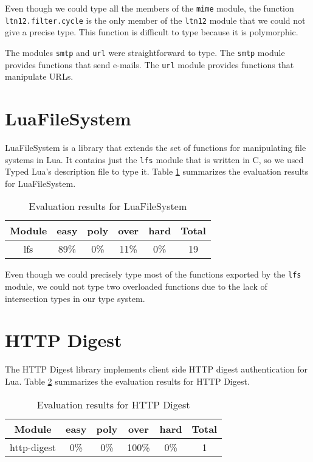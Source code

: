 Even though we could type all the members of the \texttt{mime} module,
the function \texttt{ltn12.filter.cycle} is the only member of the
\texttt{ltn12} module that we could not give a precise type.
This function is difficult to type because it is polymorphic.

The modules \texttt{smtp} and \texttt{url} were straightforward to type.
The \texttt{smtp} module provides functions that send e-mails.
The \texttt{url} module provides functions that manipulate URLs.

\section{LuaFileSystem}

LuaFileSystem is a library that extends the set of functions
for manipulating file systems in Lua.
It contains just the \texttt{lfs} module that is written in C,
so we used Typed Lua's description file to type it.
Table \ref{tab:evallfs} summarizes the evaluation results for LuaFileSystem.

\begin{table}[!ht]
\begin{center}
\begin{tabular}{|c|c|c|c|c|c|}
\hline
\textbf{Module} & \textbf{easy} & \textbf{poly} & \textbf{over} & \textbf{hard} & \textbf{Total} \\
\hline
lfs & 89\% & 0\% & 11\% & 0\% & 19 \\ %
\hline
\end{tabular}
\end{center}
\caption{Evaluation results for LuaFileSystem}
\label{tab:evallfs}
\end{table}

Even though we could precisely type most of the functions exported
by the \texttt{lfs} module, we could not type two overloaded functions
due to the lack of intersection types in our type system.

\section{HTTP Digest}

The HTTP Digest library implements client side HTTP digest authentication for Lua.
Table \ref{tab:evalhttpdigest} summarizes the evaluation results for HTTP Digest.

\begin{table}[!ht]
\begin{center}
\begin{tabular}{|c|c|c|c|c|c|}
\hline
\textbf{Module} & \textbf{easy} & \textbf{poly} & \textbf{over} & \textbf{hard} & \textbf{Total} \\
\hline
http-digest & 0\% & 0\% & 100\% & 0\% & 1 \\ %
\hline
\end{tabular}
\end{center}
\caption{Evaluation results for HTTP Digest}
\label{tab:evalhttpdigest}
\end{table}

